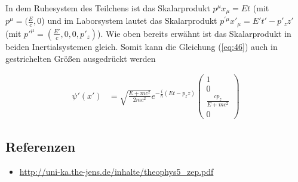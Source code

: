 In dem Ruhesystem des Teilchens ist das Skalarprodukt \(p^{\mu}x_{\mu}=Et\) (mit \(p^{\mu} = (\frac{E}{c},0\)) und im Laborsystem lautet das Skalarprodukt \(p^{'\mu}x'_{\mu}=E't'-p'_zz'\) (mit \(p'^{\mu}=(\frac{E'}{c},0,0,p'_z)\)). Wie oben bereits erwähnt ist das Skalarprodukt in beiden Inertialsystemen gleich. Somit kann die Gleichung (\ref{eq:46}) auch in gestrichelten Größen ausgedrückt werden

\begin{align}
  \label{eq:47}
  \psi'(x') &=\sqrt{\frac{E + mc^2}{2mc^2}}e^{-\frac{i}{\hbar}(Et-p_z z) }
   \begin{pmatrix}
      1\\0\\\frac{cp_z}{E+mc^2}\\0
    \end{pmatrix}
\end{align}


\subsection*{Referenzen}
\begin{itemize}
\item \url{http://uni-ka.the-jens.de/inhalte/theophys5_zep.pdf}
\end{itemize}
  

